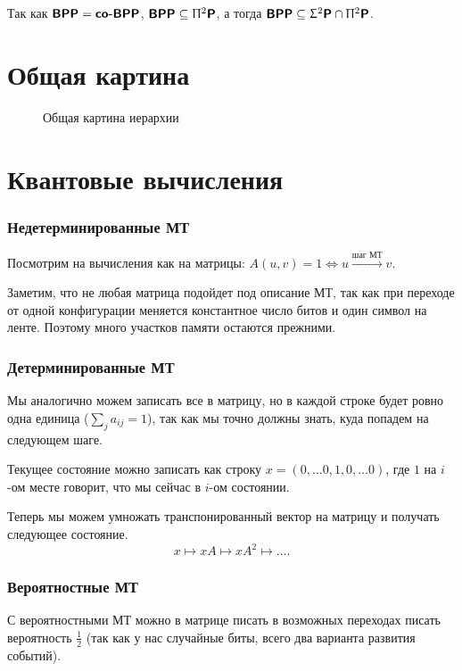 \begin{note}
	Так как $ \textmd{\textbf{\textsf{BPP}}} = \textmd{\textbf{\textsf{co-BPP}}}$, $ \textmd{\textbf{\textsf{BPP}}} \subseteq \Uppi^2\textmd{\textbf{\textsf{P}}}$, а тогда $ \textmd{\textbf{\textsf{BPP}}} \subseteq \Upsigma^2\textmd{\textbf{\textsf{P}}} \cap \Uppi^2\textmd{\textbf{\textsf{P}}}$.
\end{note}

\newpage
\section{Общая картина}
\begin{figure}[ht]
    \centering
    \caption{Общая картина иерархии}
    \label{fig:general-picture}
\end{figure}

\section{Квантовые вычисления}
\subsubsection{Недетерминированные МТ}
Посмотрим на вычисления как на матрицы: $ A(u, v) = 1 \Longleftrightarrow u \stackrel{\text{шаг МТ}}{\longrightarrow} v$.

Заметим, что не любая матрица подойдет под описание МТ, так как при переходе от одной конфигурации меняется константное число битов и один символ на ленте. Поэтому много участков памяти остаются прежними.

\subsubsection{Детерминированные МТ}
Мы аналогично можем записать все в матрицу, но в каждой строке будет ровно одна единица ($ \sum_{j}^{} a_{ij} = 1$), так как мы точно должны знать, куда попадем на следующем шаге.

Текущее состояние можно записать как строку $ x = (0, \ldots 0, 1, 0, \ldots 0)$, где $ 1$ на $ i$-ом месте говорит, что мы сейчас в $ i$-ом состоянии.

Теперь мы можем умножать транспонированный вектор на матрицу и получать следующее состояние.
\[
x \longmapsto xA \longmapsto xA^2 \longmapsto \ldots 
.\] 

\subsubsection{Вероятностные МТ}
С вероятностными МТ можно в матрице писать в возможных переходах писать вероятность $ \tfrac{1}{2}$ (так как у нас случайные биты, всего два варианта развития событий).

